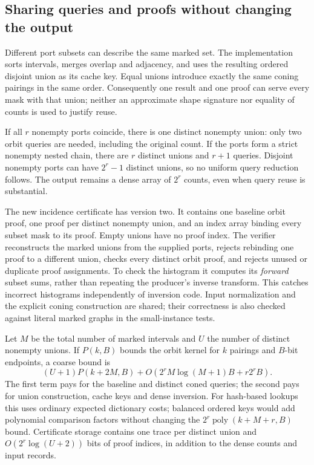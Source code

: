 \subsection{Sharing queries and proofs without changing the output}

Different port subsets can describe the same marked set. The implementation
sorts intervals, merges overlap and adjacency, and uses the resulting
ordered disjoint union as its cache key. Equal unions introduce exactly
the same coning pairings in the same order. Consequently one result and
one proof can serve every mask with that union; neither an approximate
shape signature nor equality of counts is used to justify reuse.

If all $r$ nonempty ports coincide, there is one distinct nonempty union:
only two orbit queries are needed, including the original count. If the
ports form a strict nonempty nested chain, there are $r$ distinct unions
and $r+1$ queries. Disjoint nonempty ports can have $2^r-1$ distinct unions,
so no uniform query reduction follows. The output remains a dense array
of $2^r$ counts, even when query reuse is substantial.

The new incidence certificate has version two. It contains one baseline
orbit proof, one proof per distinct nonempty union, and an index array
binding every subset mask to its proof. Empty unions have no proof index.
The verifier reconstructs the marked unions from the supplied ports,
rejects rebinding one proof to a different union, checks every distinct
orbit proof, and rejects unused or duplicate proof assignments. To check
the histogram it computes its \emph{forward} subset sums, rather than
repeating the producer's inverse transform. This catches incorrect
histograms independently of inversion code. Input normalization and the
explicit coning construction are shared; their correctness is also checked
against literal marked graphs in the small-instance tests.

Let $M$ be the total number of marked intervals and $U$ the number of
distinct nonempty unions. If $P(k,B)$ bounds the orbit kernel for $k$
pairings and $B$-bit endpoints, a coarse bound is
\[
 (U+1)P(k+2M,B)
 +O\!\left(2^r M\log(M+1)B+r2^r B\right).
\]
The first term pays for the baseline and distinct coned queries; the second
pays for union construction, cache keys and dense inversion. For hash-based
lookups this uses ordinary expected dictionary costs; balanced ordered
keys would add polynomial comparison factors without changing the
$2^r\operatorname{poly}(k+M+r,B)$ bound. Certificate storage contains one
trace per distinct union and $O(2^r\log(U+2))$ bits of proof indices,
in addition to the dense counts and input records.

